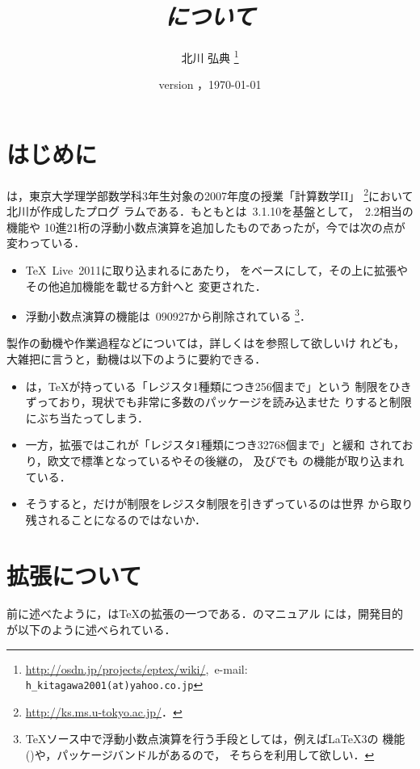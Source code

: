 \documentclass[a4paper,11pt,nomag,dvipdfmx]{jsarticle}
\begin{document}
\title{\emph{\epTeX について}}
\author{北川 弘典\null
\thanks{\url{http://osdn.jp/projects/eptex/wiki/},\ 
e-mail: \texttt{h\_kitagawa2001(at)yahoo.co.jp}}}
\date{version \the\epTeXversion，\today}
\maketitle
\tableofcontents

\newpage
\section{はじめに}
\epTeX は，東京大学理学部数学科3年生対象の2007年度の授業「計算数学II」
\footnote{\url{http://ks.ms.u-tokyo.ac.jp/}．}において北川が作成したプログ
ラムである．もともとは\pTeX~3.1.10を基盤として，\eTeX~2.2相当の機能や
10進21桁の浮動小数点演算を追加したものであったが，今では次の点が変わっている．
\begin{itemize}
  \item \TeX~Live~2011に取り込まれるにあたり，
  \eTeX をベースにして，その上に\pTeX 拡張やその他追加機能を載せる方針へと
  変更された．
  \item 浮動小数点演算の機能は\epTeX~090927から削除されている
  \footnote{%
  \TeX ソース中で浮動小数点演算を行う手段としては，例えば\LaTeX3の
  機能()や，パッケージバンドルがあるので，
  そちらを利用して欲しい．}．
\end{itemize}

製作の動機や作業過程などについては，詳しくは\cite{h7k}を参照して欲しいけ
れども，大雑把に言うと，動機は以下のように要約できる．
\begin{itemize}
\item \pTeX は，\TeX が持っている「レジスタ1種類につき256個まで」という
      制限をひきずっており，現状でも非常に多数のパッケージを読み込ませた
      りすると制限にぶち当たってしまう．
\item 一方，\eTeX 拡張ではこれが「レジスタ1種類につき32768個まで」と緩和
      されており，欧文で標準となっているやその後継の，
      及びでも
      \eTeX の機能が取り込まれている．
\item そうすると，\pTeX だけが制限をレジスタ制限を引きずっているのは世界
      から取り残されることになるのではないか．
\end{itemize}

\section{\eTeX 拡張について}
前に述べたように，\eTeX は\TeX の拡張の一つである．\eTeX のマニュアル
\cite{etexman}には，開発目的が以下のように述べられている．
\end{document}
